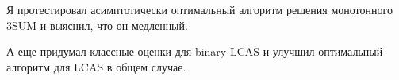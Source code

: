 Я протестировал асимптотически оптимальный алгоритм решения монотонного 3SUM и выяснил, что он медленный.

А еще придумал классные оценки для binary LCAS и улучшил оптимальный алгоритм для LCAS в общем случае.